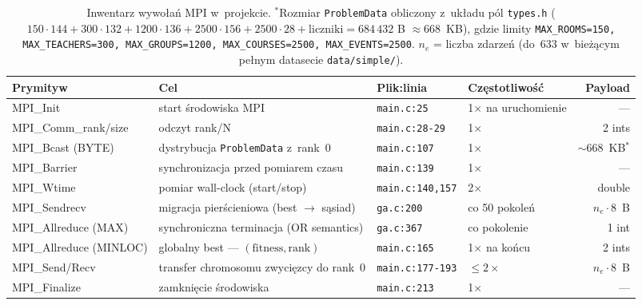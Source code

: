 \documentclass{common/sprawozdanie-agh}
\begin{document}
\begin{table}[H]
\centering\footnotesize
\renewcommand{\arraystretch}{1.25}
\begin{tabularx}{\textwidth}{>{\ttfamily}l X l l r}
\toprule
\textbf{Prymityw}      & \textbf{Cel}                                            & \textbf{Plik:linia}        & \textbf{Częstotliwość}   & \textbf{Payload} \\
\midrule
MPI\_Init              & start środowiska MPI                                    & \texttt{main.c:25}         & 1$\times$ na uruchomienie & --- \\
MPI\_Comm\_rank/size   & odczyt rank/N                                           & \texttt{main.c:28-29}      & 1$\times$                 & 2 ints \\
MPI\_Bcast (BYTE)      & dystrybucja \texttt{ProblemData} z~rank~0               & \texttt{main.c:107}        & 1$\times$                 & $\sim$668~KB$^*$ \\
MPI\_Barrier           & synchronizacja przed pomiarem czasu                     & \texttt{main.c:139}        & 1$\times$                 & --- \\
MPI\_Wtime             & pomiar wall-clock (start/stop)                          & \texttt{main.c:140,157}    & 2$\times$                 & double \\
MPI\_Sendrecv          & migracja pierścieniowa (best $\to$ sąsiad)              & \texttt{ga.c:200}          & co 50 pokoleń             & $n_e \cdot 8$~B \\
MPI\_Allreduce (MAX)   & synchroniczna terminacja (OR semantics)                 & \texttt{ga.c:367}          & co pokolenie              & 1 int \\
MPI\_Allreduce (MINLOC)& globalny best --- $(\text{fitness}, \text{rank})$       & \texttt{main.c:165}        & 1$\times$ na końcu        & 2 ints \\
MPI\_Send/Recv         & transfer chromosomu zwycięzcy do rank~0                 & \texttt{main.c:177-193}    & $\leq 2\times$            & $n_e \cdot 8$~B \\
MPI\_Finalize          & zamknięcie środowiska                                   & \texttt{main.c:213}        & 1$\times$                 & --- \\
\bottomrule
\end{tabularx}
\caption{Inwentarz wywołań MPI w~projekcie. $^*$Rozmiar \texttt{ProblemData} obliczony z~układu pól \texttt{types.h} ($150{\cdot}144 + 300{\cdot}132 + 1200{\cdot}136 + 2500{\cdot}156 + 2500{\cdot}28 + \text{liczniki} = 684\,432$ B $\approx 668$~KB), gdzie limity \texttt{MAX\_ROOMS=150, MAX\_TEACHERS=300, MAX\_GROUPS=1200, MAX\_COURSES=2500, MAX\_EVENTS=2500}. $n_e$ = liczba zdarzeń (do~633 w~bieżącym pełnym datasecie \texttt{data/simple/}).}
\label{tab:mpi-inventory}
\end{table}
\end{document}
